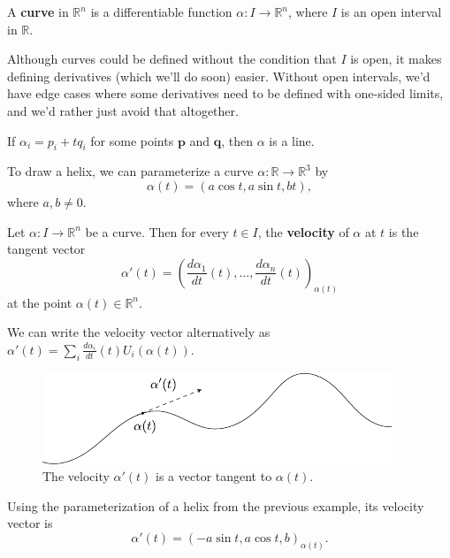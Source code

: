 \documentclass[10pt]{report}
\begin{document}
\begin{defn}
A \textbf{curve} in $\mathbb{R}^n$ is a differentiable function $\alpha:I\to \mathbb{R}^n$, where $I$ is an open interval in $\mathbb{R}$.
\end{defn}

Although curves could be defined without the condition that $I$ is open, it makes defining derivatives (which we'll do soon) easier. Without open intervals, we'd have edge cases where some derivatives need to be defined with one-sided limits, and we'd rather just avoid that altogether.

\begin{ex}{}{}
If $\alpha_i = p_i + t q_i$ for some points $\mathbf{p}$ and $\mathbf{q}$, then $\alpha$ is a line.
\end{ex}

\pagebreak

\begin{ex}
	To draw a helix, we can parameterize a curve $\alpha:\mathbb{R}\to \mathbb{R}^3$ by 
	\[
		\alpha(t)=(a \cos t, a \sin t, bt),
	\] where $a, b\neq 0$.
\end{ex}

\begin{defn}
Let $\alpha:I\to \mathbb{R}^n$ be a curve. Then for every $t \in I$, the \textbf{velocity} of $\alpha$ at $t$ is the tangent vector
\[
	\alpha'(t) = \left( \frac{d \alpha_1}{d t} (t), \dots, \frac{d \alpha_n}{d t} (t) \right)_{\alpha(t)}
\] at the point $\alpha(t) \in \mathbb{R}^n$.
\end{defn}

We can write the velocity vector alternatively as $\alpha'(t) = \sum_i \frac{d \alpha_i}{d t} (t) U_i(\alpha(t))$.

\begin{figure}[H]
	\centering
	\includegraphics[scale=1]{fig/velocity.pdf}
	\caption{The velocity $\alpha'(t)$ is a vector tangent to $\alpha(t)$.}
\end{figure}


\begin{ex}
Using the parameterization of a helix from the previous example, its velocity vector is
\[
	\alpha'(t) = (-a \sin t, a \cos t, b)_{\alpha(t)}.
\]
\end{ex}
\end{document}
